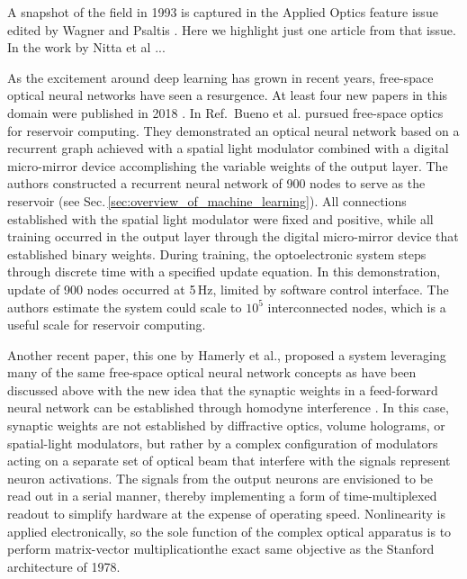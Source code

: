 
A snapshot of the field in 1993 is captured in the Applied Optics feature issue edited by Wagner and Psaltis \cite{waps1993}. Here we highlight just one article from that issue. In the work by Nitta et al \cite{nioh1993} ...

\cite{safi1995}

As the excitement around deep learning has grown in recent years, free-space optical neural networks have seen a resurgence. At least four new papers in this domain were published in 2018 \cite{buma2018,hasl2018,liri2018,chsi2018}. In Ref.\,\cite{buma2018} Bueno et al. pursued free-space optics for reservoir computing. They demonstrated an optical neural network based on a recurrent graph achieved with a spatial light modulator combined with a digital micro-mirror device accomplishing the variable weights of the output layer. The authors constructed a recurrent neural network of 900 nodes to serve as the reservoir (see Sec.\,\ref{sec:overview_of_machine_learning}). All connections established with the spatial light modulator were fixed and positive, while all training occurred in the output layer through the digital micro-mirror device that established binary weights. During training, the optoelectronic system steps through discrete time with a specified update equation. In this demonstration, update of 900 nodes occurred at 5\,Hz, limited by software control interface. The authors estimate the system could scale to $10^5$ interconnected nodes, which is a useful scale for reservoir computing. 

Another recent paper, this one by Hamerly et al., proposed a system leveraging many of the same free-space optical neural network concepts as have been discussed above with the new idea that the synaptic weights in a feed-forward neural network can be established through homodyne interference \cite{hasl2018}. In this case, synaptic weights are not established by diffractive optics, volume holograms, or spatial-light modulators, but rather by a complex configuration of modulators acting on a separate set of optical beam that interfere with the signals represent neuron activations. The signals from the output neurons are envisioned to be read out in a serial manner, thereby implementing a form of time-multiplexed readout to simplify hardware at the expense of operating speed. Nonlinearity is applied electronically, so the sole function of the complex optical apparatus is to perform matrix-vector multiplication\textemdash the exact same objective as the Stanford architecture of 1978. 

